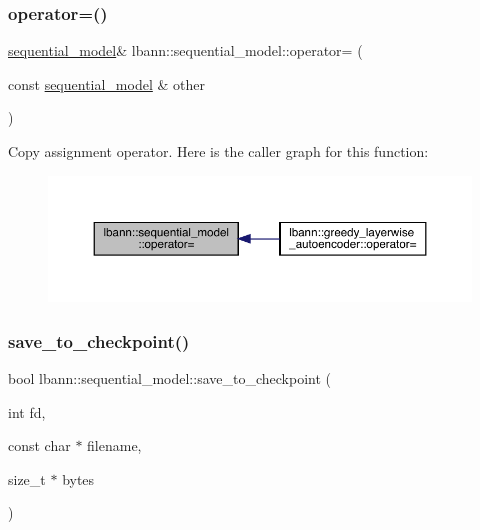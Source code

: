 \subsubsection{\texorpdfstring{operator=()}{operator=()}}
{\footnotesize\ttfamily \hyperlink{classlbann_1_1sequential__model}{sequential\+\_\+model}\& lbann\+::sequential\+\_\+model\+::operator= (\begin{DoxyParamCaption}\item[{const \hyperlink{classlbann_1_1sequential__model}{sequential\+\_\+model} \&}]{other }\end{DoxyParamCaption})\hspace{0.3cm}{\ttfamily [default]}}

Copy assignment operator. Here is the caller graph for this function\+:\nopagebreak
\begin{figure}[H]
\begin{center}
\leavevmode
\includegraphics[width=350pt]{classlbann_1_1sequential__model_a9714c99522b90488c486b390c5a7b6f3_icgraph}
\end{center}
\end{figure}
\mbox{\label{classlbann_1_1sequential__model_a51cd5ae859c66cfb36d25d968ef06203}} 
\subsubsection{\texorpdfstring{save\+\_\+to\+\_\+checkpoint()}{save\_to\_checkpoint()}}
{\footnotesize\ttfamily bool lbann\+::sequential\+\_\+model\+::save\+\_\+to\+\_\+checkpoint (\begin{DoxyParamCaption}\item[{int}]{fd,  }\item[{const char $\ast$}]{filename,  }\item[{size\+\_\+t $\ast$}]{bytes }\end{DoxyParamCaption})}



